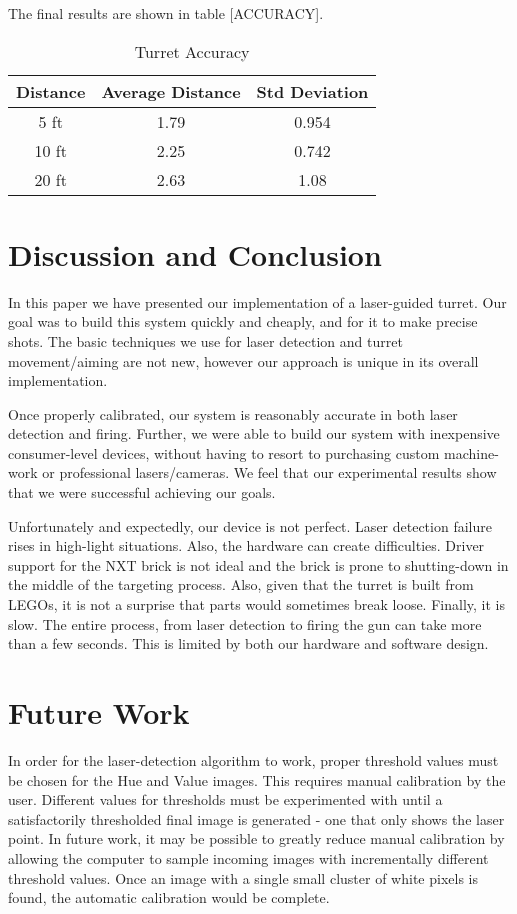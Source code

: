 \documentclass[10pt,twocolumn,letterpaper]{article}
\begin{document}
The final results are shown in table [ACCURACY]. 

\begin{table}[ht]
\caption{Turret Accuracy}
\centering
\begin{tabular} {c c c}
\hline
Distance & Average Distance & Std Deviation\\
\hline
5 ft & 1.79 & 0.954 \\
10 ft & 2.25 & 0.742 \\
20 ft & 2.63 & 1.08 \\
\hline
\end{tabular}
\label{table:accuracy}
\end{table}

\section{Discussion and Conclusion}

In this paper we have presented our implementation of a laser-guided turret.  Our goal was to build this system quickly and cheaply, and for it to make precise shots.  The basic techniques we use for laser detection and turret movement/aiming are not new, however our approach is unique in its overall implementation.

Once properly calibrated, our system is reasonably accurate in both laser detection and firing.  Further, we were able to build our system with inexpensive consumer-level devices, without having to resort to purchasing custom machine-work or professional lasers/cameras.  We feel that our experimental results show that we were successful achieving our goals.

Unfortunately and expectedly, our device is not perfect.  Laser detection failure rises in high-light situations.  Also, the hardware can create difficulties.  Driver support for the NXT brick is not ideal and the brick is prone to shutting-down in the middle of the targeting process.  Also, given that the turret is built from LEGOs, it is not a surprise that parts would sometimes break loose.  Finally, it is slow.  The entire process, from laser detection to firing the gun can take more than a few seconds.  This is limited by both our hardware and software design.  

\section{Future Work}

In order for the laser-detection algorithm to work, proper threshold values must be chosen for the Hue and Value images.  This requires manual calibration by the user.  Different values for thresholds must be experimented with until a satisfactorily thresholded final image is generated - one that only shows the laser point.  In future work, it may be possible to greatly reduce manual calibration by allowing the computer to sample incoming images with incrementally different threshold values.  Once an image with a single small cluster of white pixels is found, the automatic calibration would be complete.
\end{document}
